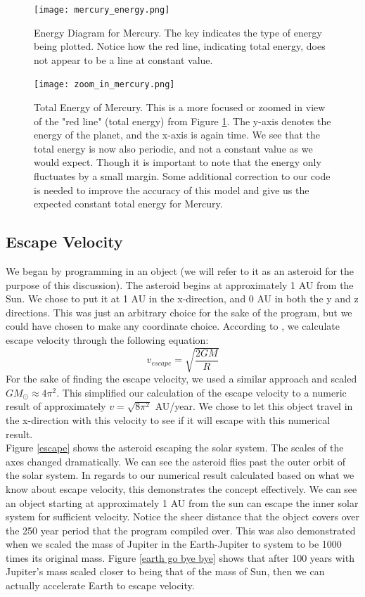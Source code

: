 \documentclass{article}
\begin{document}
\begin{figure}
  \centering
  \texttt{[image: mercury\_energy.png]}
  \caption{Energy Diagram for Mercury. The key indicates the type of energy being plotted. Notice how the red line, indicating total energy, does not appear to be a line at constant value.}
  \label{mercury energy}
\end{figure}
\begin{figure}
  \centering
  \texttt{[image: zoom\_in\_mercury.png]}
  \caption{Total Energy of Mercury. This is a more focused or zoomed in view of the "red line" (total energy) from Figure \ref{mercury energy}. The y-axis denotes the energy of the planet, and the x-axis is again time. We see that the total energy is now also periodic, and not a constant value as we would expect. Though it is important to note that the energy only fluctuates by a small margin. Some additional correction to our code is needed to improve the accuracy of this model and give us the expected constant total energy for Mercury.}
  \label{zoom in}
\end{figure}


\subsection{Escape Velocity}

We began by programming in an object (we will refer to it as an asteroid for the purpose of this discussion). The asteroid begins at approximately 1 AU from the Sun. We chose to put it at 1 AU in the x-direction, and 0 AU in both the y and z directions. This was just an arbitrary choice for the sake of the program, but we could have chosen to make any coordinate choice. According to \cite{escape velocity}, we calculate escape velocity through the following equation:
\begin{equation}
v_{escape} = \sqrt{\frac{2 G M}{R}}
\end{equation}
For the sake of finding the escape velocity, we used a similar approach and scaled $GM_\odot \approx 4 \pi^2$. This simplified our calculation of the escape velocity to a numeric result of approximately $v=\sqrt{8 \pi^2}$ AU/year. We chose to let this object travel in the x-direction with this velocity to see if it will escape with this numerical result.\\

Figure \ref{escape} shows the asteroid escaping the solar system. The scales of the axes changed dramatically. We can see the asteroid flies past the outer orbit of the solar system. In regards to our numerical result calculated based on what we know about escape velocity, this demonstrates the concept effectively. We can see an object starting at approximately 1 AU from the sun can escape the inner solar system for sufficient velocity. Notice the sheer distance that the object covers over the 250 year period that the program compiled over. This was also demonstrated when we scaled the mass of Jupiter in the Earth-Jupiter to system to be 1000 times its original mass. Figure \ref{earth go bye bye} shows that after 100 years with Jupiter's mass scaled closer to being that of the mass of Sun, then we can actually accelerate Earth to escape velocity. \\
\end{document}
